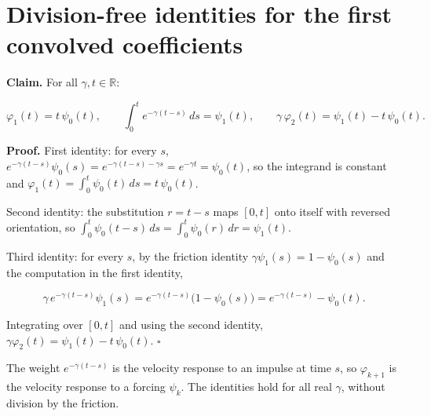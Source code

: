 \documentclass[11pt,a4paper]{article}
\begin{document}
\section{\texorpdfstring{Division-free identities for the first convolved coefficients}{Division-free identities for the first convolved coefficients}}


\textbf{Claim.} For all \(\gamma,t\in\mathbb R\):


\[\varphi_1(t)=t\,\psi_0(t),\qquad\int_0^te^{-\gamma(t-s)}\,ds=\psi_1(t),\qquad\gamma\,\varphi_2(t)=\psi_1(t)-t\,\psi_0(t).\]


\textbf{Proof.} First identity: for every \(s\), \(e^{-\gamma(t-s)}\psi_0(s)=e^{-\gamma(t-s)-\gamma s}=e^{-\gamma t}=\psi_0(t)\), so the integrand is constant and \(\varphi_1(t)=\int_0^t\psi_0(t)\,ds=t\,\psi_0(t)\).




Second identity: the substitution \(r=t-s\) maps \([0,t]\) onto itself with reversed orientation, so \(\int_0^t\psi_0(t-s)\,ds=\int_0^t\psi_0(r)\,dr=\psi_1(t)\).




Third identity: for every \(s\), by the friction identity \(\gamma\psi_1(s)=1-\psi_0(s)\) and the computation in the first identity,


\[\gamma\,e^{-\gamma(t-s)}\psi_1(s)=e^{-\gamma(t-s)}\bigl(1-\psi_0(s)\bigr)=e^{-\gamma(t-s)}-\psi_0(t).\]


Integrating over \([0,t]\) and using the second identity, \(\gamma\varphi_2(t)=\psi_1(t)-t\,\psi_0(t)\). \(\square\)




The weight \(e^{-\gamma(t-s)}\) is the velocity response to an impulse at time \(s\), so \(\varphi_{k+1}\) is the velocity response to a forcing \(\psi_k\). The identities hold for all real \(\gamma\), without division by the friction.
\end{document}
